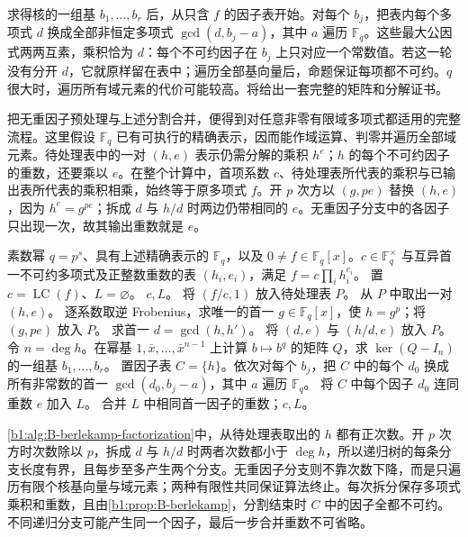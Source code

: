 \ProseParagraphBreak
求得核的一组基 \(b_1,\ldots,b_r\) 后，从只含 \(f\) 的因子表开始。对每个 \(b_j\)，把表内每个多项式 \(d\) 换成全部非恒定多项式 \(\gcd(d,b_j-a)\)，其中 \(a\) 遍历 \(\mathbb F_q\)。这些最大公因式两两互素，乘积恰为 \(d\)：每个不可约因子在 \(b_j\) 上只对应一个常数值。若这一轮没有分开 \(d\)，它就原样留在表中；遍历全部基向量后，命题保证每项都不可约。\(q\) 很大时，遍历所有域元素的代价可能较高。将给出一套完整的矩阵和分解证书。

\ProseParagraphBreak
把无重因子预处理与上述分割合并，便得到对任意非零有限域多项式都适用的完整流程。这里假设 \(\mathbb F_q\) 已有可执行的精确表示，因而能作域运算、判零并遍历全部域元素。待处理表中的一对 \((h,e)\) 表示仍需分解的乘积 \(h^e\)；\(h\) 的每个不可约因子的重数，还要乘以 \(e\)。在整个计算中，首项系数 \(c\)、待处理表所代表的乘积与已输出表所代表的乘积相乘，始终等于原多项式 \(f\)。开 \(p\) 次方以 \((g,pe)\) 替换 \((h,e)\)，因为 \(h^e=g^{pe}\)；拆成 \(d\) 与 \(h/d\) 时两边仍带相同的 \(e\)。无重因子分支中的各因子只出现一次，故其输出重数就是 \(e\)。

\begin{algorithm}[htbp]
	\caption{Berlekamp 有限域因式分解}
	\label{b1:alg:B-berlekamp-factorization}
	\begin{algorithmsteps}{素数幂 \(q=p^s\)、具有上述精确表示的 \(\mathbb F_q\)，以及 \(0\ne f\in\mathbb F_q[x]\)。}{\(c\in\mathbb F_q^\times\) 与互异首一不可约多项式及正整数重数的表 \((h_i,e_i)\)，满足 \(f=c\prod_i h_i^{e_i}\)。}
		\State 置 \(c=\operatorname{LC}(f)\)、\(L=\varnothing\)。
			\State \Return \(c,L\)。
		\EndIf
		\State 将 \((f/c,1)\) 放入待处理表 \(P\)。
			\State 从 \(P\) 中取出一对 \((h,e)\)。
				\State 逐系数取逆 Frobenius，求唯一的首一 \(g\in\mathbb F_q[x]\)，使 \(h=g^p\)；将 \((g,pe)\) 放入 \(P\)。
			\Else
				\State 求首一 \(d=\gcd(h,h')\)。
					\State 将 \((d,e)\) 与 \((h/d,e)\) 放入 \(P\)。
				\Else
					\State 令 \(n=\deg h\)。在幂基 \(1,\bar x,\ldots,\bar x^{n-1}\) 上计算 \(b\mapsto b^q\) 的矩阵 \(Q\)，求 \(\ker(Q-I_n)\) 的一组基 \(b_1,\ldots,b_r\)。
					\State 置因子表 \(C=\{h\}\)。依次对每个 \(b_j\)，把 \(C\) 中的每个 \(d_0\) 换成所有非常数的首一 \(\gcd(d_0,b_j-a)\)，其中 \(a\) 遍历 \(\mathbb F_q\)。
					\State 将 \(C\) 中每个因子 \(d_0\) 连同重数 \(e\) 加入 \(L\)。
				\EndIf
			\EndIf
		\EndWhile
		\State 合并 \(L\) 中相同首一因子的重数；\Return \(c,L\)。
	\end{algorithmsteps}
\end{algorithm}

\cref{b1:alg:B-berlekamp-factorization}中，从待处理表取出的 \(h\) 都有正次数。开 \(p\) 次方时次数除以 \(p\)，拆成 \(d\) 与 \(h/d\) 时两者次数都小于 \(\deg h\)，所以递归树的每条分支长度有界，且每步至多产生两个分支。无重因子分支则不靠次数下降，而是只遍历有限个核基向量与域元素；两种有限性共同保证算法终止。每次拆分保存多项式乘积和重数，且由\cref{b1:prop:B-berlekamp}，分割结束时 \(C\) 中的因子全都不可约。不同递归分支可能产生同一个因子，最后一步合并重数不可省略。
